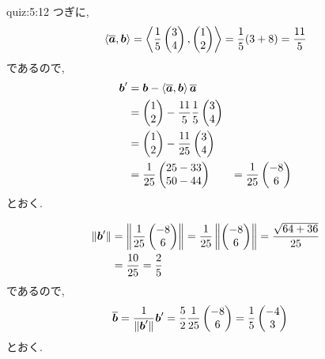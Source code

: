 \begin{answerof}{quiz:5:12}
  つぎに,
  \begin{align*}
    \Braket{\overline {\boldsymbol{a}},\boldsymbol{b}}=\Braket{\frac{1}{5}\begin{pmatrix}3\\4\end{pmatrix},\begin{pmatrix}1\\2\end{pmatrix}}
    =\frac{1}{5}(3+8)=\frac{11}{5}
  \end{align*}
  であるので,
  \begin{align*}
    \boldsymbol{b}'
    &=\boldsymbol{b}-\Braket{\overline{\boldsymbol{a}},\boldsymbol{b}}\overline{\boldsymbol{a}}\\
    &=
    \begin{pmatrix}1\\2\end{pmatrix}-\frac{11}{5}\frac{1}{5}\begin{pmatrix}3\\4\end{pmatrix}\\
    &=
    \begin{pmatrix}1\\2\end{pmatrix}-\frac{11}{25}\begin{pmatrix}3\\4\end{pmatrix}\\
    &=
    \frac{1}{25}\begin{pmatrix}25-33\\50-44\end{pmatrix}
    &=
    \frac{1}{25}\begin{pmatrix}-8\\6\end{pmatrix}
  \end{align*}
  とおく.

  \begin{align*}
    \|\boldsymbol{b}'\|
    &=\left\|\frac{1}{25}\begin{pmatrix}-8\\6\end{pmatrix}\right\|
    =\frac{1}{25}\left\|\begin{pmatrix}-8\\6\end{pmatrix}\right\|
    =\frac{\sqrt{64+36}}{25}\\
    &=\frac{10}{25}
    =\frac{2}{5}
  \end{align*}
  であるので,
  \begin{align*}
    \overline{\boldsymbol{b}}
    &=\frac{1}{\|\boldsymbol{b}'\|}\boldsymbol{b}'
    =\frac{5}{2}\frac{1}{25}\begin{pmatrix}-8\\6\end{pmatrix}
    =\frac{1}{5}\begin{pmatrix}-4\\3\end{pmatrix}
  \end{align*}
  とおく.


\end{answerof}
